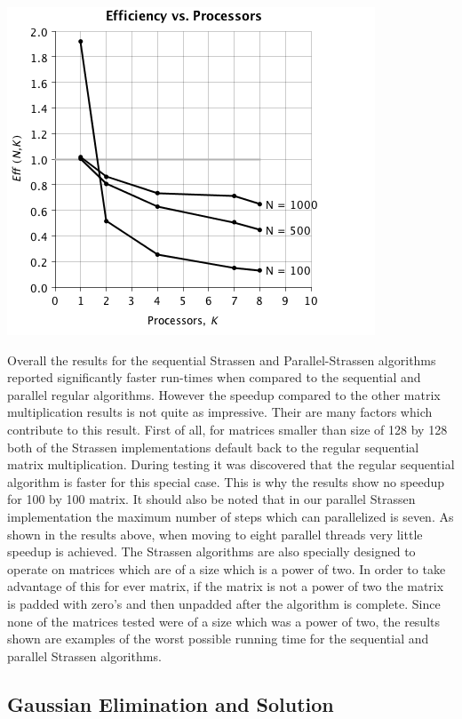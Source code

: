 \documentclass{dependencies/acm_proc_article-sp}
\begin{document}
\begin{center}
\includegraphics[scale=0.5]{images/parallel-stras/eff-vs-proc.png}
\end{center}
Overall the results for the sequential Strassen and Parallel-Strassen
algorithms reported significantly faster run-times when compared to the
sequential and parallel regular algorithms. However the speedup
compared to the other matrix multiplication results is not quite as
impressive. Their are many factors which contribute to this result.
First of all, for matrices smaller than size of 128 by 128 both of the
Strassen implementations default back to the regular sequential matrix
multiplication. During testing it was discovered that the regular sequential
algorithm is faster for this special case. This is why the results show no
speedup for 100 by 100 matrix. It should also be noted that in our parallel
Strassen implementation the maximum number of steps which can parallelized is
seven. As shown in the results above, when moving to eight parallel threads
very little speedup is achieved. The Strassen algorithms are also specially
designed to operate on matrices which are of a size which is a power of two.
In order to take advantage of this for ever matrix, if the matrix is not a
power of two the matrix is padded with zero's and then unpadded after the
algorithm is complete. Since none of the matrices tested were of a size which
was a power of two, the results shown are examples of the worst possible
running time for the sequential and parallel Strassen algorithms. 

\subsection{Gaussian Elimination and Solution}
\end{document}

